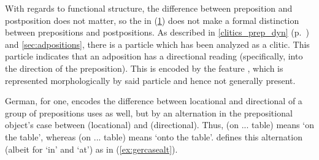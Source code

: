 With regards to functional structure, the difference between preposition and
postposition does not matter, so the \Avm{} in (\ref{ex:adpmorphlex}) does not
make a formal distinction between prepositions and postpositions. As described
in \autoref{clitics_prep_dyn} (p.~\pageref{clitics_prep_dyn}) and 
\autoref{sec:adpositions}, there is a particle  which has been
analyzed as a clitic. This particle indicates that an adposition has a
directional reading (specifically, into the direction of the preposition). This
is encoded by the feature \PSem{}, which is represented morphologically by said
particle and hence not generally present.

\begin{figure}[h]
\begin{morphlex}
\pex\label{ex:adpmorphlex}%
\a{}

\a{}
\xe
\end{morphlex}
\end{figure}


German, for one, encodes the difference between locational and directional of a
group of prepositions uses as well, but by an alternation in the prepositional
object's case between \Dat{} (locational) and \Acc{} (directional). Thus,
 (on \Def{}.\Dat{}.\M{}.\Sg{} table) means `on the table',
whereas  (on \Def{}.\Acc{}.\M {}.\Sg{} table) means `onto the
table'. \citet{butt2005} defines this alternation (albeit for  `in' and
 `at') as in (\ref{ex:gercasealt}).

